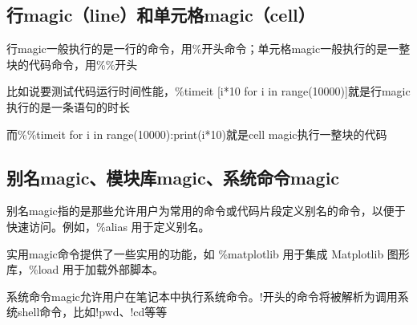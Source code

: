\documentclass[10pt]{article}
\begin{document}
	\subsection{行magic（line）和单元格magic（cell）}
	行magic一般执行的是一行的命令，用\%开头命令；单元格magic一般执行的是一整块的代码命令，用\%\%开头\par
	比如说要测试代码运行时间性能，\%timeit [i*10 for i in range(10000)]就是行magic执行的是一条语句的时长\par
	而\%\%timeit for i in range(10000):print(i*10)就是cell magic执行一整块的代码
	\subsection{别名magic、模块库magic、系统命令magic}
	别名magic指的是那些允许用户为常用的命令或代码片段定义别名的命令，以便于快速访问。例如，\%alias 用于定义别名。\par
	实用magic命令提供了一些实用的功能，如 \%matplotlib 用于集成 Matplotlib 图形库，\%load 用于加载外部脚本。\par
	系统命令magic允许用户在笔记本中执行系统命令。!开头的命令将被解析为调用系统shell命令，比如!pwd、!cd等等\par
	
	
\end{document}
